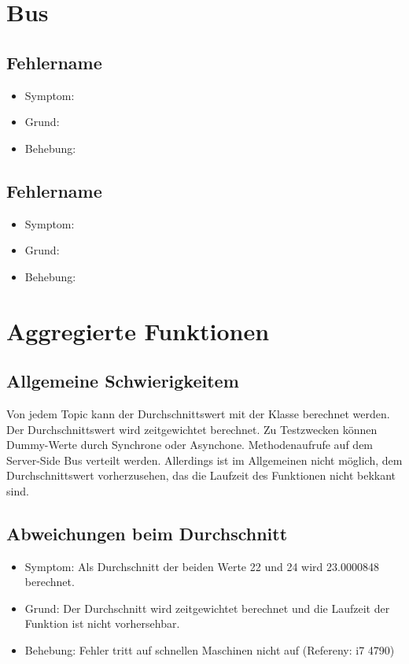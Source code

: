 \documentclass[qualitaetssicherung.tex]{subfiles}
\begin{document}
\section{Bus}

	\subsection{Fehlername}
		\begin{itemize}
			\item
			Symptom: 
			\item
			Grund:
			\item
			Behebung:
		\end{itemize}
		
	\subsection{Fehlername}
		\begin{itemize}
			\item
			Symptom:
			\item
			Grund:
			\item
			Behebung:
		\end{itemize}
		
\section{Aggregierte Funktionen}

	\subsection{Allgemeine Schwierigkeitem} 
		Von jedem Topic kann der Durchschnittswert mit der Klasse \label{Class: AverageComputation} berechnet werden. Der Durchschnittswert wird zeitgewichtet berechnet. Zu Testzwecken können Dummy-Werte durch Synchrone oder Asynchone. Methodenaufrufe auf dem Server-Side Bus verteilt werden. Allerdings ist im Allgemeinen nicht möglich, dem Durchschnittswert vorherzusehen, das die Laufzeit des Funktionen nicht bekkant sind.

	\subsection{Abweichungen beim Durchschnitt}
		\begin{itemize}
			\item
			Symptom: Als Durchschnitt der beiden Werte 22 und 24 wird 23.0000848 berechnet.
			\item
			Grund: Der Durchschnitt wird zeitgewichtet berechnet und die Laufzeit der Funktion ist nicht vorhersehbar.
			\item
			Behebung: Fehler tritt auf schnellen Maschinen nicht auf (Refereny: i7 4790)

		\end{itemize}
\end{document}

